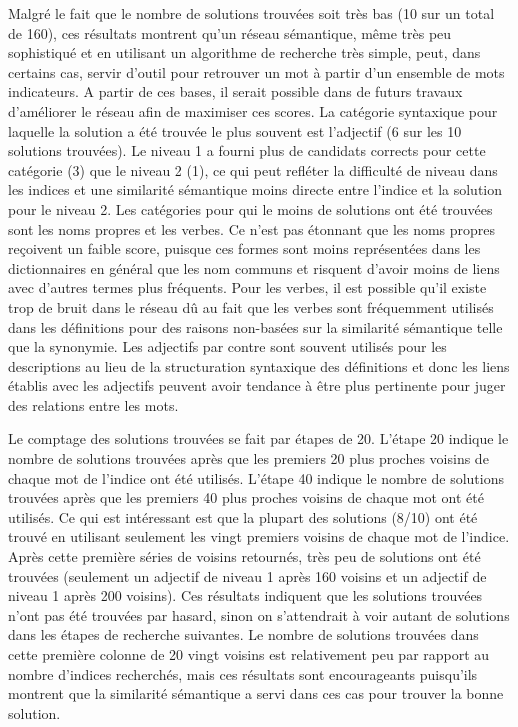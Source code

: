 Malgré le fait que le nombre de solutions trouvées soit très bas (10 sur un total de 160), ces résultats montrent qu'un réseau sémantique, même très peu sophistiqué et en utilisant un algorithme de recherche très simple, peut, dans certains cas, servir d'outil pour retrouver un mot à partir d'un ensemble de mots indicateurs. A partir de ces bases, il serait possible dans de futurs travaux d'améliorer le réseau afin de maximiser ces scores. La catégorie syntaxique pour laquelle la solution a été trouvée le plus souvent est l'adjectif (6 sur les 10 solutions trouvées). Le niveau 1 a fourni plus de candidats corrects pour cette catégorie (3) que le niveau 2 (1), ce qui peut refléter la difficulté de niveau dans les indices et une similarité sémantique moins directe entre l'indice et la solution pour le niveau 2. Les catégories pour qui le moins de solutions ont été trouvées sont les noms propres et les verbes. Ce n'est pas étonnant que les noms propres reçoivent un faible score, puisque ces formes sont moins représentées dans les dictionnaires en général que les nom communs et risquent d'avoir moins de liens avec d'autres termes plus fréquents. Pour les verbes, il est possible qu'il existe trop de bruit dans le réseau dû au fait que les verbes sont fréquemment utilisés dans les définitions pour des raisons non-basées sur la similarité sémantique telle que la synonymie. Les adjectifs par contre sont souvent utilisés pour les descriptions au lieu de la structuration syntaxique des définitions et donc les liens établis avec les adjectifs peuvent avoir tendance à être plus pertinente pour juger des relations entre les mots.

Le comptage des solutions trouvées se fait par étapes de 20. L'étape 20 indique le nombre de solutions trouvées après que les premiers 20 plus proches voisins de chaque mot de l'indice ont été utilisés. L'étape 40 indique le nombre de solutions trouvées après que les premiers 40 plus proches voisins de chaque mot ont été utilisés. Ce qui est intéressant est que la plupart des solutions (8/10) ont été trouvé en utilisant seulement les vingt premiers voisins de chaque mot de l'indice. Après cette première séries de voisins retournés, très peu de solutions ont été trouvées (seulement un adjectif de niveau 1 après 160 voisins et un adjectif de niveau 1 après 200 voisins). Ces résultats indiquent que les solutions trouvées n'ont pas été trouvées par hasard, sinon on s'attendrait à voir autant de solutions dans les étapes de recherche suivantes. Le nombre de solutions trouvées dans cette première colonne de 20 vingt voisins est relativement peu par rapport au nombre d'indices recherchés, mais ces résultats sont encourageants puisqu'ils montrent que la similarité sémantique a servi dans ces cas pour trouver la bonne solution.

